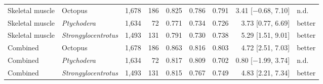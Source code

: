 \begin{table}[H]
\begin{tabular}{llrrrrrrl}
Skeletal muscle & Octopus & 1,678 & 186 & 0.825 & 0.786 & 0.791 & 3.41 [$-$0.68, 7.10] & n.d. \\
Skeletal muscle & \textit{Ptychodera} & 1,634 & 72 & 0.771 & 0.734 & 0.726 & 3.73 [0.77, 6.69] & better \\
Skeletal muscle & \textit{Strongylocentrotus} & 1,493 & 131 & 0.791 & 0.730 & 0.738 & 5.29 [1.51, 9.01] & better \\
Combined & Octopus & 1,678 & 186 & 0.863 & 0.816 & 0.803 & 4.72 [2.51, 7.03] & better \\
Combined & \textit{Ptychodera} & 1,634 & 72 & 0.817 & 0.809 & 0.702 & 0.80 [$-$1.99, 3.74] & n.d. \\
Combined & \textit{Strongylocentrotus} & 1,493 & 131 & 0.815 & 0.767 & 0.749 & 4.83 [2.21, 7.34] & better \\
\bottomrule
\end{tabular}


\end{table}
